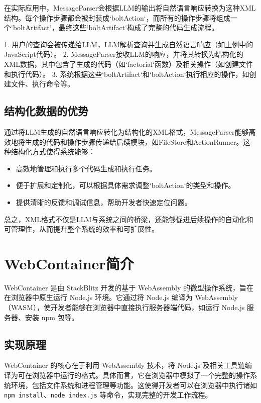 在实际应用中，MessageParser会根据LLM的输出将自然语言响应转换为这种XML结构。每个操作步骤都会被封装成`boltAction`，而所有的操作步骤将组成一个`boltArtifact`，最终这些`boltArtifact`构成了完整的代码生成流程。

1. 用户的查询会被传递给LLM，LLM解析查询并生成自然语言响应（如上例中的JavaScript代码）。
2. MessageParser接收LLM的响应，并将其转换为结构化的XML数据，其中包含了生成的代码（如`factorial`函数）及相关操作（如创建文件和执行代码）。
3. 系统根据这些`boltArtifact`和`boltAction`执行相应的操作，如创建文件、执行命令等。

\subsection{结构化数据的优势}

通过将LLM生成的自然语言响应转化为结构化的XML格式，MessageParser能够高效地将生成的代码和操作步骤传递给后续模块，如FileStore和ActionRunner。这种结构化方式使得系统能够：
\begin{itemize}
    \item 高效地管理和执行多个代码生成和执行任务。
    \item 便于扩展和定制化，可以根据具体需求调整`boltAction`的类型和操作。
    \item 提供清晰的反馈和调试信息，帮助开发者快速定位问题。
\end{itemize}

总之，XML格式不仅是LLM与系统之间的桥梁，还能够促进后续操作的自动化和可管理性，从而提升整个系统的效率和可扩展性。

\section{WebContainer简介}

WebContainer 是由 StackBlitz 开发的基于 WebAssembly 的微型操作系统，旨在在浏览器中原生运行 Node.js 环境。它通过将 Node.js 编译为 WebAssembly（WASM），使开发者能够在浏览器中直接执行服务器端代码，如运行 Node.js 服务器、安装 npm 包等。 

\subsection{实现原理}

WebContainer 的核心在于利用 WebAssembly 技术，将 Node.js 及相关工具链编译为可在浏览器中运行的格式。具体而言，它在浏览器中模拟了一个完整的操作系统环境，包括文件系统和进程管理等功能。这使得开发者可以在浏览器中执行诸如 \texttt{npm install}、\texttt{node index.js} 等命令，实现完整的开发工作流程。 

